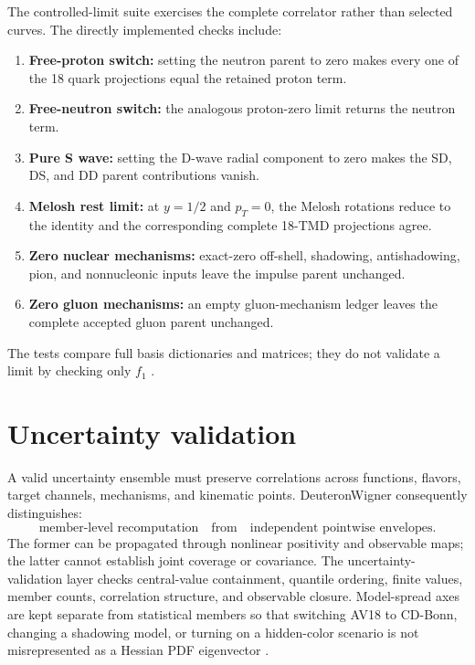 \documentclass[11pt,oneside]{book}
\begin{document}
The controlled-limit suite exercises the complete correlator rather than selected curves.  The directly implemented checks include:
\begin{enumerate}[label=(\alph*)]
 \item \textbf{Free-proton switch:} setting the neutron parent to zero makes every one of the 18 quark projections equal the retained proton term.
 \item \textbf{Free-neutron switch:} the analogous proton-zero limit returns the neutron term.
 \item \textbf{Pure S wave:} setting the D-wave radial component to zero makes the SD, DS, and DD parent contributions vanish.
 \item \textbf{Melosh rest limit:} at $y=1/2$ and $p_T=0$, the Melosh rotations reduce to the identity and the corresponding complete 18-TMD projections agree.
 \item \textbf{Zero nuclear mechanisms:} exact-zero off-shell, shadowing, antishadowing, pion, and nonnucleonic inputs leave the impulse parent unchanged.
 \item \textbf{Zero gluon mechanisms:} an empty gluon-mechanism ledger leaves the complete accepted gluon parent unchanged.
\end{enumerate}
The tests compare full basis dictionaries and matrices; they do not validate a limit by checking only $f_1$ \cite{DWSourceAudit2026,DWProductionBoundary2026}.

\section{Uncertainty validation}

A valid uncertainty ensemble must preserve correlations across functions, flavors, target channels, mechanisms, and kinematic points.  DeuteronWigner consequently distinguishes:
\begin{equation}
 \text{member-level recomputation}
 \quad\text{from}\quad
 \text{independent pointwise envelopes}.
\end{equation}
The former can be propagated through nonlinear positivity and observable maps; the latter cannot establish joint coverage or covariance.  The uncertainty-validation layer checks central-value containment, quantile ordering, finite values, member counts, correlation structure, and observable closure.  Model-spread axes are kept separate from statistical members so that switching AV18 to CD-Bonn, changing a shadowing model, or turning on a hidden-color scenario is not misrepresented as a Hessian PDF eigenvector \cite{DWProductionBoundary2026}.
\end{document}
